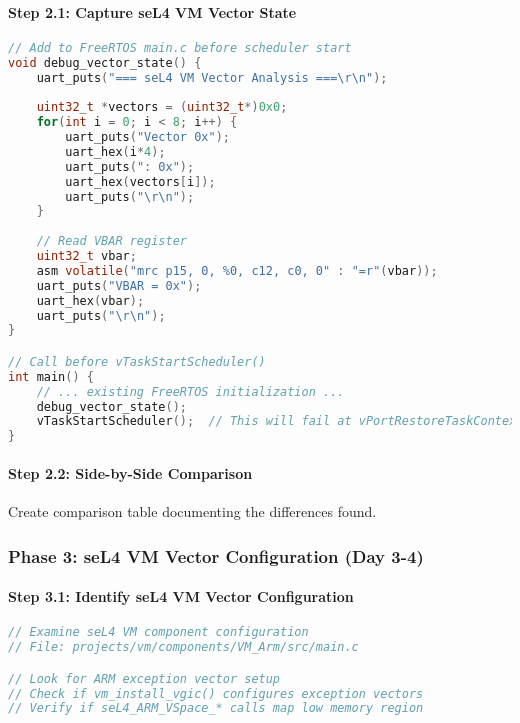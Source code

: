 \documentclass[11pt,a4paper]{article}
\begin{document}
\paragraph{Step 2.1: Capture seL4 VM Vector State}
\begin{lstlisting}[language=c]
// Add to FreeRTOS main.c before scheduler start
void debug_vector_state() {
    uart_puts("=== seL4 VM Vector Analysis ===\r\n");
    
    uint32_t *vectors = (uint32_t*)0x0;
    for(int i = 0; i < 8; i++) {
        uart_puts("Vector 0x");
        uart_hex(i*4);
        uart_puts(": 0x");
        uart_hex(vectors[i]);
        uart_puts("\r\n");
    }
    
    // Read VBAR register
    uint32_t vbar;
    asm volatile("mrc p15, 0, %0, c12, c0, 0" : "=r"(vbar));
    uart_puts("VBAR = 0x");
    uart_hex(vbar);
    uart_puts("\r\n");
}

// Call before vTaskStartScheduler()
int main() {
    // ... existing FreeRTOS initialization ...
    debug_vector_state();
    vTaskStartScheduler();  // This will fail at vPortRestoreTaskContext
}
\end{lstlisting}

\paragraph{Step 2.2: Side-by-Side Comparison}
Create comparison table documenting the differences found.

\subsubsection{Phase 3: seL4 VM Vector Configuration (Day 3-4)}

\paragraph{Step 3.1: Identify seL4 VM Vector Configuration}
\begin{lstlisting}[language=c]
// Examine seL4 VM component configuration
// File: projects/vm/components/VM_Arm/src/main.c

// Look for ARM exception vector setup
// Check if vm_install_vgic() configures exception vectors
// Verify if seL4_ARM_VSpace_* calls map low memory region
\end{lstlisting}
\end{document}
